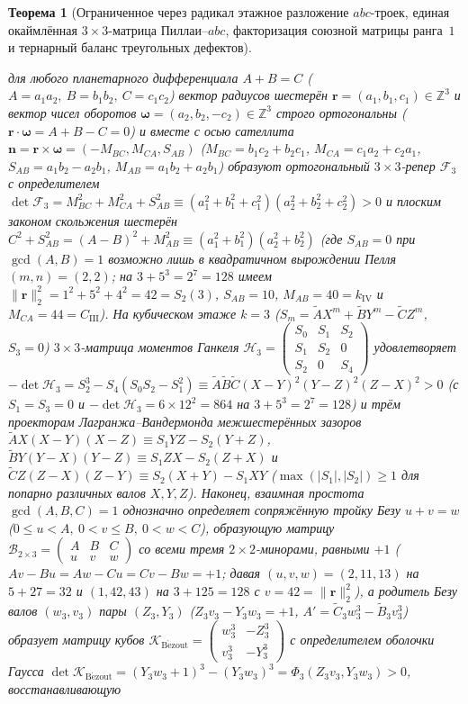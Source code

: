 \documentclass[11pt,a4paper]{article}
\theoremstyle{plain}
\newtheorem{theorem}{Теорема}[section]
\theoremstyle{definition}
\begin{document}
\begin{theorem}[Ограниченное через радикал этажное разложение $abc$-троек, единая окаймлённая $3\times 3$-матрица Пиллаи--$abc$, факторизация союзной матрицы ранга~$1$ и тернарный баланс треугольных дефектов]
\begin{enumerate}[label=\textbf{(\roman*)},leftmargin=*]
  для любого планетарного дифференциала $A + B = C$ ($A = a_1 a_2,\ B = b_1 b_2,\ C = c_1 c_2$) вектор радиусов шестерён $\mathbf{r} = (a_1,b_1,c_1)\in\mathbb{Z}^3$ и вектор чисел оборотов $\mathbf{\omega} = (a_2,b_2,-c_2)\in\mathbb{Z}^3$ строго ортогональны ($\mathbf{r}\cdot\mathbf{\omega} = A+B-C = 0$) и вместе с осью сателлита $\mathbf{n} = \mathbf{r}\times\mathbf{\omega} = (-M_{BC},M_{CA},S_{AB})$ ($M_{BC} = b_1 c_2 + b_2 c_1$, $M_{CA} = c_1 a_2 + c_2 a_1$, $S_{AB} = a_1 b_2 - a_2 b_1$, $M_{AB} = a_1 b_2 + a_2 b_1$) образуют ортогональный $3\times 3$-репер $\mathcal{F}_3$ с определителем $\det\mathcal{F}_3 = M_{BC}^2 + M_{CA}^2 + S_{AB}^2 \equiv (a_1^2+b_1^2+c_1^2)(a_2^2+b_2^2+c_2^2) > 0$ и плоским законом скольжения шестерён $C^2 + S_{AB}^2 = (A-B)^2 + M_{AB}^2 \equiv (a_1^2+b_1^2)(a_2^2+b_2^2)$ (где $S_{AB}=0$ при $\gcd(A,B)=1$ возможно лишь в квадратичном вырождении Пелля $(m,n)=(2,2)$; на $3+5^3=2^7=128$ имеем $\|\mathbf{r}\|_2^2 = 1^2+5^2+4^2 = 42 = S_2(3)$, $S_{AB}=10$, $M_{AB}=40=k_{\mathrm{IV}}$ и $M_{CA}=44=C_{\mathrm{III}}$). На кубическом этаже $k=3$ ($S_m = \widetilde{A}X^m + \widetilde{B}Y^m - \widetilde{C}Z^m$, $S_3 = 0$) $3\times 3$-матрица моментов Ганкеля $\mathcal{H}_3 = \begin{pmatrix} S_0 & S_1 & S_2 \\ S_1 & S_2 & 0 \\ S_2 & 0 & S_4 \end{pmatrix}$ удовлетворяет $-\det\mathcal{H}_3 = S_2^3 - S_4(S_0 S_2 - S_1^2) \equiv \widetilde{A}\widetilde{B}\widetilde{C}(X-Y)^2(Y-Z)^2(Z-X)^2 > 0$ (с $S_1 = S_3 = 0$ и $-\det\mathcal{H}_3 = 6\times 12^2 = 864$ на $3+5^3=2^7=128$) и трём проекторам Лагранжа--Вандермонда межшестерённых зазоров $\widetilde{A}X(X-Y)(X-Z) \equiv S_1 YZ - S_2(Y+Z)$, $\widetilde{B}Y(Y-X)(Y-Z) \equiv S_1 ZX - S_2(Z+X)$ и $\widetilde{C}Z(Z-X)(Z-Y) \equiv S_2(X+Y) - S_1 XY$ ($\max(|S_1|,|S_2|)\ge 1$ для попарно различных валов $X,Y,Z$). Наконец, взаимная простота $\gcd(A,B,C)=1$ однозначно определяет сопряжённую тройку Безу $u+v=w$ ($0\le u < A,\ 0 < v \le B,\ 0 < w < C$), образующую матрицу $\mathcal{B}_{2\times 3} = \begin{pmatrix} A & B & C \\ u & v & w \end{pmatrix}$ со всеми тремя $2\times 2$-минорами, равными $+1$ ($Av-Bu = Aw-Cu = Cv-Bw = +1$; давая $(u,v,w) = (2,11,13)$ на $5+27=32$ и $(1,42,43)$ на $3+125=128$ с $v=42=\|\mathbf{r}\|_2^2$), а родитель Безу валов $(w_3,v_3)$ пары $(Z_3,Y_3)$ ($Z_3 v_3 - Y_3 w_3 = +1$, $A' = \widetilde{C}_3 w_3^3 - \widetilde{B}_3 v_3^3$) образует матрицу кубов $\mathcal{K}_{\mathrm{B\acute{e}zout}} = \begin{pmatrix} w_3^3 & -Z_3^3 \\ v_3^3 & -Y_3^3 \end{pmatrix}$ с определителем оболочки Гаусса $\det\mathcal{K}_{\mathrm{B\acute{e}zout}} = (Y_3 w_3+1)^3 - (Y_3 w_3)^3 = \Phi_3(Z_3 v_3, Y_3 w_3) > 0$, восстанавливающую 
\end{enumerate}
\end{theorem}
\end{document}
